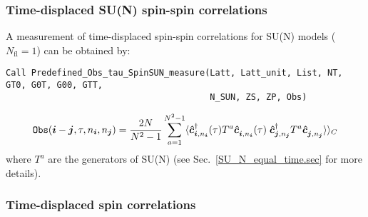 \subsubsection{Time-displaced SU(N) spin-spin correlations}


A measurement of time-displaced spin-spin correlations for SU(N) models ($N_\text{fl} = 1$) can be obtained by:
\begin{lstlisting}[style=fortran]
Call Predefined_Obs_tau_SpinSUN_measure(Latt, Latt_unit, List, NT, GT0, G0T, G00, GTT, 
                                        N_SUN, ZS, ZP, Obs)
\end{lstlisting}
\begin{align}
\texttt{Obs}(\ve{i} - \ve{j}, \tau, n_{\ve{i}},  n_{\ve{j}} )= \frac{2N}{N^2-1}\sum_{a=1}^{N^2 - 1}  \langle \ve{\hat{c}}^{\dagger}_{\ve{i}, n_{\ve{i}}}(\tau) T^a \ve{\hat{c}}^{\phantom\dagger}_{\ve{i}, n_{\ve{i}}}(\tau)  \;
    \ve{\hat{c}}^{\dagger}_{\ve{j}, n_{\ve{j}}} T^a \ve{\hat{c}}^{\phantom\dagger}_{\ve{j}, n_{\ve{j}}}    \rangle  \rangle_{C}
\end{align}
where $T^a$ are the generators of SU(N) (see Sec.~\ref{SU_N_equal_time.sec}  for more details).


\subsubsection{Time-displaced spin correlations}

